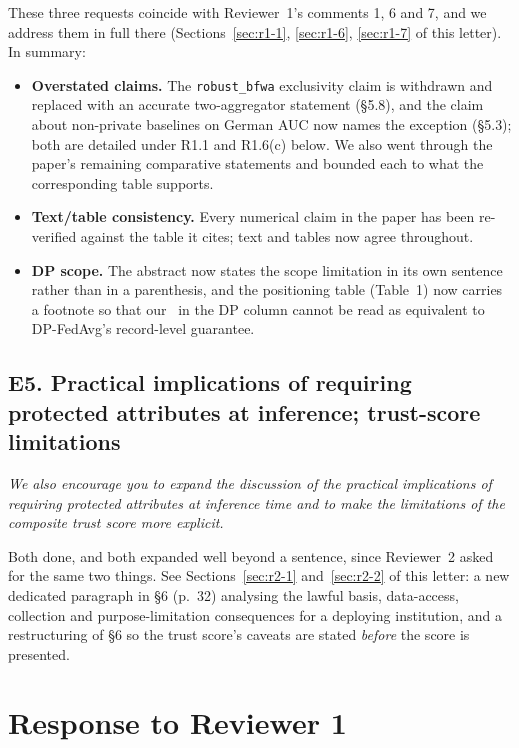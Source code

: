 \documentclass[11pt,a4paper]{article}
\newenvironment{comment}
  {\begin{mdframed}[backgroundcolor=quotegray,linewidth=0pt,skipabove=8pt,
    skipbelow=6pt,innertopmargin=6pt,innerbottommargin=6pt]\itshape}
  {\end{mdframed}}
\begin{document}
These three requests coincide with Reviewer~1's comments 1, 6 and 7, and we
address them in full there (Sections~\ref{sec:r1-1}, \ref{sec:r1-6},
\ref{sec:r1-7} of this letter). In summary:

\begin{itemize}[leftmargin=1.2em,itemsep=2pt]
\item \textbf{Overstated claims.} The \texttt{robust\_bfwa} exclusivity claim is
withdrawn and replaced with an accurate two-aggregator statement (\S5.8), and
the claim about non-private baselines on German AUC now names the exception
(\S5.3); both are detailed under R1.1 and R1.6(c) below. We also went through
the paper's remaining comparative statements and bounded each to what the
corresponding table supports.
\item \textbf{Text/table consistency.} Every numerical claim in the paper has
been re-verified against the table it cites; text and tables now agree
throughout.
\item \textbf{DP scope.} The abstract now states the scope limitation in its own
sentence rather than in a parenthesis, and the positioning table (Table~1) now
carries a footnote so that our \checkmark\ in the DP column cannot be read as
equivalent to DP-FedAvg's record-level guarantee.
\end{itemize}

\subsection*{E5. Practical implications of requiring protected attributes at inference; trust-score limitations}

\begin{comment}
We also encourage you to expand the discussion of the practical implications of
requiring protected attributes at inference time and to make the limitations of
the composite trust score more explicit.
\end{comment}

Both done, and both expanded well beyond a sentence, since Reviewer~2 asked for
the same two things. See Sections~\ref{sec:r2-1} and~\ref{sec:r2-2} of this
letter: a new dedicated paragraph in \S6 (p.~32) analysing the lawful basis,
data-access, collection and purpose-limitation consequences for a deploying
institution, and a restructuring of \S6 so the trust score's caveats are stated
\emph{before} the score is presented.

\section{Response to Reviewer 1}
\end{document}
